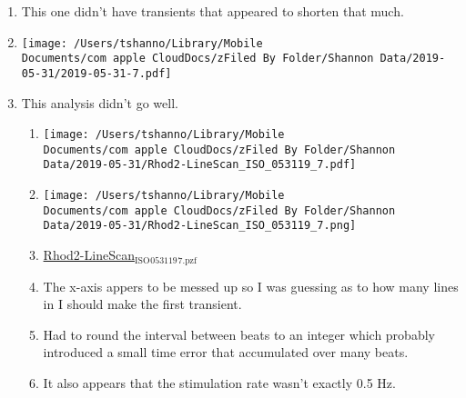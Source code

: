 \documentclass[11pt]{article}
\begin{document}
\begin{enumerate}
\begin{enumerate}
\begin{enumerate}
\begin{center}
\end{center}
\label{sec:org852ca96}
\item This one didn't have transients that appeared to shorten that much.
\label{sec:orgddb0213}
\item \begin{center}
\texttt{[image: /Users/tshanno/Library/Mobile Documents/com~apple~CloudDocs/zFiled By Folder/Shannon Data/2019-05-31/2019-05-31-7.pdf]}
\end{center}
\label{sec:orgdd47f4e}
\item This analysis didn't go well.
\label{sec:org371da42}
\begin{enumerate}
\item \begin{center}
\texttt{[image: /Users/tshanno/Library/Mobile Documents/com~apple~CloudDocs/zFiled By Folder/Shannon Data/2019-05-31/Rhod2-LineScan\_ISO\_053119\_7.pdf]}
\end{center}
\label{sec:org3c2925a}
\item \begin{center}
\texttt{[image: /Users/tshanno/Library/Mobile Documents/com~apple~CloudDocs/zFiled By Folder/Shannon Data/2019-05-31/Rhod2-LineScan\_ISO\_053119\_7.png]}
\end{center}
\label{sec:org758c8b0}
\item \href{file:///Users/tshanno/Library/Mobile Documents/com\~apple\~CloudDocs/zFiled By Folder/Shannon Data/2019-05-31/Rhod2-LineScan\_ISO\_053119\_7.pzf}{Rhod2-LineScan\(_{\text{ISO}}\)\(_{\text{053119}}\)\(_{\text{7.pzf}}\)}
\label{sec:org1be8715}
\item The x-axis appers to be messed up so I was guessing as to how many lines in I should make the first transient.
\label{sec:orgac3e4d5}
\item Had to round the interval between beats to an integer which probably introduced a small time error that accumulated over many beats.
\label{sec:org248f3d2}
\item It also appears that the stimulation rate wasn't exactly 0.5 Hz.
\label{sec:orgc309272}
\end{enumerate}
\end{enumerate}
\end{enumerate}
\end{enumerate}
\end{document}
